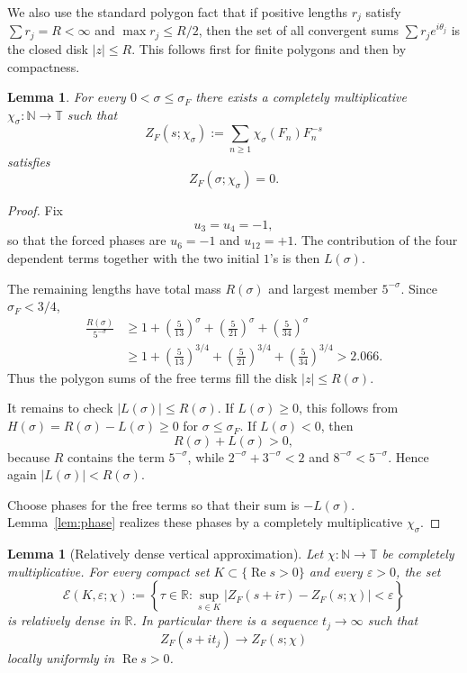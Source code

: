 \documentclass[11pt]{article}
\newtheorem{lemma}[theorem]{Lemma}
\theoremstyle{remark}
\newcommand{\T}{\mathbb T}
\newcommand{\ZF}{Z_F}
\newcommand{\Ree}{\operatorname{Re}}
\begin{document}
We also use the standard polygon fact that if positive lengths $r_j$ satisfy $\sum r_j=R<\infty$ and $\max r_j\le R/2$, then the set of all convergent sums $\sum r_je^{i\theta_j}$ is the closed disk $|z|\le R$.  This follows first for finite polygons and then by compactness.

\begin{lemma}\label{lem:twistzero}
For every $0<\sigma\le\sigma_F$ there exists a completely multiplicative $\chi_\sigma:\mathbb N\to\T$ such that
\[
\ZF(s;\chi_\sigma):=\sum_{n\ge1}\chi_\sigma(F_n)F_n^{-s}
\]
satisfies
\[
\ZF(\sigma;\chi_\sigma)=0.
\]
\end{lemma}

\begin{proof}
Fix
\[
u_3=u_4=-1,
\]
so that the forced phases are $u_6=-1$ and $u_{12}=+1$.  The contribution of the four dependent terms together with the two initial $1$'s is then $L(\sigma)$.

The remaining lengths have total mass $R(\sigma)$ and largest member $5^{-\sigma}$.  Since $\sigma_F<3/4$,
\begin{align*}
\frac{R(\sigma)}{5^{-\sigma}}
&\ge 1+\left(\frac5{13}\right)^\sigma
       +\left(\frac5{21}\right)^\sigma
       +\left(\frac5{34}\right)^\sigma\\
&\ge 1+\left(\frac5{13}\right)^{3/4}
       +\left(\frac5{21}\right)^{3/4}
       +\left(\frac5{34}\right)^{3/4}
>2.066.
\end{align*}
Thus the polygon sums of the free terms fill the disk $|z|\le R(\sigma)$.

It remains to check $|L(\sigma)|\le R(\sigma)$.  If $L(\sigma)\ge0$, this follows from $H(\sigma)=R(\sigma)-L(\sigma)\ge0$ for $\sigma\le\sigma_F$.  If $L(\sigma)<0$, then
\[
R(\sigma)+L(\sigma)>0,
\]
because $R$ contains the term $5^{-\sigma}$, while $2^{-\sigma}+3^{-\sigma}<2$ and $8^{-\sigma}<5^{-\sigma}$.  Hence again $|L(\sigma)|<R(\sigma)$.

Choose phases for the free terms so that their sum is $-L(\sigma)$.  Lemma~\ref{lem:phase} realizes these phases by a completely multiplicative $\chi_\sigma$.
\end{proof}

\begin{lemma}[Relatively dense vertical approximation]\label{lem:vertical}
Let $\chi:\mathbb N\to\T$ be completely multiplicative.  For every compact set
$K\subset\{\Ree s>0\}$ and every $\varepsilon>0$, the set
\[
\mathcal E(K,\varepsilon;\chi)
:=
\left\{\tau\in\mathbb R:
\sup_{s\in K}|\ZF(s+i\tau)-\ZF(s;\chi)|<\varepsilon
\right\}
\]
is relatively dense in $\mathbb R$.  In particular there is a sequence $t_j\to\infty$ such that
\[
\ZF(s+it_j)\longrightarrow \ZF(s;\chi)
\]
locally uniformly in $\Ree s>0$.
\end{lemma}
\end{document}

